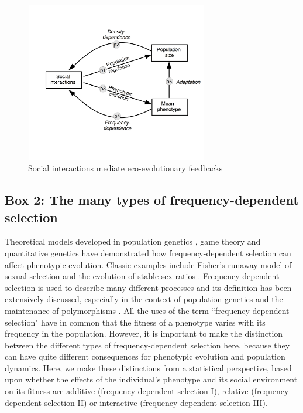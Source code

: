\documentclass{article}
\begin{document}
\begin{figure}[H]
	\centering
	\includegraphics[width=8cm, height=7cm]{Figures/Fig1.jpg}
	\caption{Social interactions mediate eco-evolutionary feedbacks}
\end{figure}


\newpage
\subsection{Box 2: The many types of frequency-dependent selection} 
\noindent Theoretical models developed in population genetics \citep{Fisher1930, Wright1969}, game theory \citep{MaynardSmith1982, McGill2007, McNamaraLeimar2020} and quantitative genetics \citep{Lande1976, Lande2007, Engen2020} have demonstrated how frequency-dependent selection can affect phenotypic evolution. Classic examples include Fisher's runaway model of sexual selection and the evolution of stable sex ratios \citep{Fisher1930}. Frequency-dependent selection is used to describe many different processes and its definition has been extensively discussed, especially in the context of population genetics and the maintenance of polymorphisms \citep{Ayala1974, Gromko1977, Heino1998}. All the uses of the term “frequency-dependent selection" have in common that the fitness of a phenotype varies with its frequency in the population. However, it is important to make the distinction between the different types of frequency-dependent selection here, because they can have quite different consequences for phenotypic evolution and population dynamics. Here, we make these distinctions from a statistical perspective, based upon whether the effects of the individual's phenotype and its social environment on its fitness are additive (frequency-dependent selection I), relative (frequency-dependent selection II) or interactive (frequency-dependent selection III).
\end{document}

